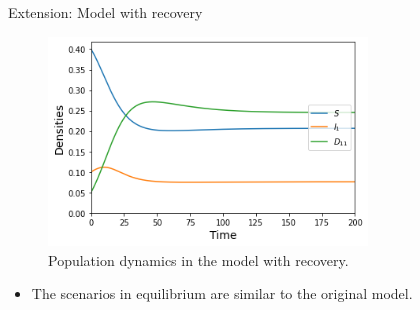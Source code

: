 \documentclass{beamer}
\begin{document}
	\begin{frame}{Extension: Model with recovery}
		\begin{figure}[ht]
			\label{Figure 12}
			\begin{center}
				\includegraphics[width=240pt]{plot_dynamics_with_recovery.jpg}
			\end{center}
			\caption{Population dynamics in the model with recovery.}
		\end{figure}
		\begin{itemize}
			\item The scenarios in equilibrium are similar to the original model.
		\end{itemize}
	\end{frame}
\end{document}
